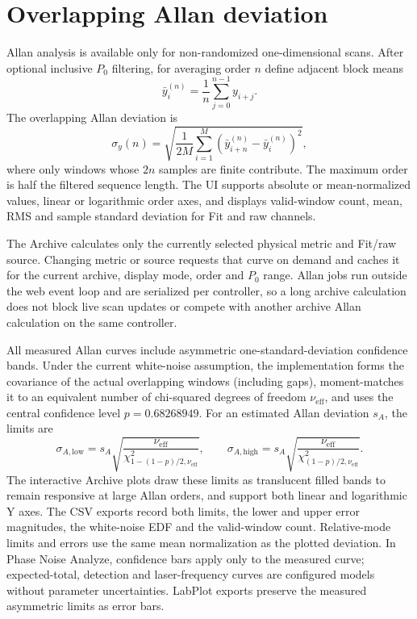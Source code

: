 \documentclass[11pt,oneside,openany]{book}
\begin{document}
\section{Overlapping Allan deviation}
Allan analysis is available only for non-randomized one-dimensional scans. After optional
inclusive $P_0$ filtering, for averaging order $n$ define adjacent block means
\begin{equation}
  \bar y_i^{(n)}=\frac{1}{n}\sum_{j=0}^{n-1}y_{i+j}.
\end{equation}
The overlapping Allan deviation is
\begin{equation}
  \sigma_y(n)=\sqrt{\frac{1}{2M}\sum_{i=1}^{M}
  \left(\bar y_{i+n}^{(n)}-\bar y_i^{(n)}\right)^2},
\end{equation}
where only windows whose $2n$ samples are finite contribute. The maximum order is half the
filtered sequence length. The UI supports absolute or mean-normalized values, linear or
logarithmic order axes, and displays valid-window count, mean, RMS and sample standard
deviation for Fit and raw channels.

The Archive calculates only the currently selected physical metric and Fit/raw source.
Changing metric or source requests that curve on demand and caches it for the current
archive, display mode, order and $P_0$ range. Allan jobs run outside the web event loop and
are serialized per controller, so a long archive calculation does not block live scan updates
or compete with another archive Allan calculation on the same controller.

All measured Allan curves include asymmetric one-standard-deviation confidence bands. Under
the current white-noise assumption, the implementation forms the covariance of the actual
overlapping windows (including gaps), moment-matches it to an equivalent number of
chi-squared degrees of freedom $\nu_{\mathrm{eff}}$, and uses the central confidence level
$p=0.68268949$. For an estimated Allan deviation $s_A$, the limits are
\begin{equation}
  \sigma_{A,\mathrm{low}}=s_A\sqrt{\frac{\nu_{\mathrm{eff}}}
  {\chi^2_{1-(1-p)/2,\nu_{\mathrm{eff}}}}},\qquad
  \sigma_{A,\mathrm{high}}=s_A\sqrt{\frac{\nu_{\mathrm{eff}}}
  {\chi^2_{(1-p)/2,\nu_{\mathrm{eff}}}}}.
\end{equation}
The interactive Archive plots draw these limits as translucent filled bands to remain responsive
at large Allan orders, and support both linear and logarithmic Y axes. The CSV exports record
both limits, the lower and upper error magnitudes, the white-noise
EDF and the valid-window count. Relative-mode limits and errors use the same mean
normalization as the plotted deviation. In Phase Noise Analyze, confidence bars apply only
to the measured curve; expected-total, detection and laser-frequency curves are configured
models without parameter uncertainties. LabPlot exports preserve the measured asymmetric
limits as error bars.
\end{document}
